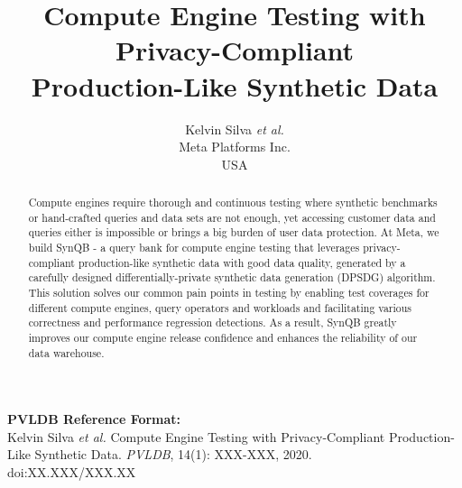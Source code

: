 \documentclass[11pt]{article}
\title{Compute Engine Testing with Privacy-Compliant\\Production-Like Synthetic Data}
\author{
Kelvin Silva \textit{et al.}\\
\small Meta Platforms Inc.\\
\small USA
}
\date{}
\begin{document}
\maketitle

\begin{abstract}
Compute engines require thorough and continuous testing where
synthetic benchmarks or hand-crafted queries and data sets are not
enough, yet accessing customer data and queries either is impossible
or brings a big burden of user data protection. At Meta, we build
SynQB - a query bank for compute engine testing that leverages
privacy-compliant production-like synthetic data with good
data quality, generated by a carefully designed differentially-private
synthetic data generation (DPSDG) algorithm. This solution solves
our common pain points in testing by enabling test coverages for
different compute engines, query operators and workloads and facilitating
various correctness and performance regression detections.
As a result, SynQB greatly improves our compute engine release
confidence and enhances the reliability of our data warehouse.
\end{abstract}

\noindent\textbf{PVLDB Reference Format:}\\
Kelvin Silva \textit{et al.} Compute
Engine Testing with Privacy-Compliant Production-Like Synthetic Data.
\textit{PVLDB}, 14(1): XXX-XXX, 2020.\\
doi:XX.XXX/XXX.XX
\end{document}
